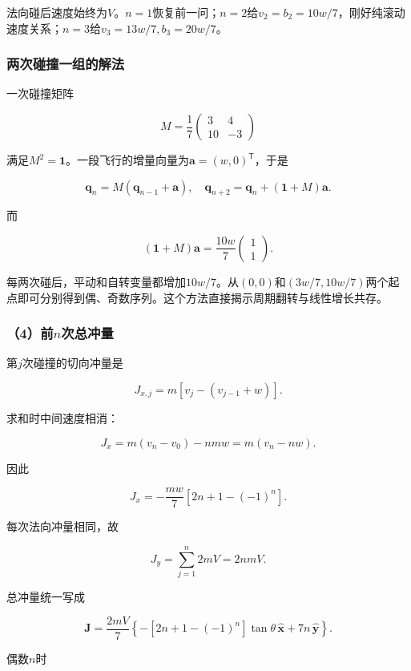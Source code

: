 \documentclass[12pt,a4paper,fontset=fandol]{ctexart}
\begin{document}
法向碰后速度始终为\(V\)。\(n=1\)恢复前一问；\(n=2\)给\(v_2=b_2=10w/7\)，刚好纯滚动速度关系；\(n=3\)给\(v_3=13w/7,b_3=20w/7\)。

\subsubsection{两次碰撞一组的解法}\label{ux4e24ux6b21ux78b0ux649eux4e00ux7ec4ux7684ux89e3ux6cd5}

一次碰撞矩阵

\[
M=\frac17
\begin{pmatrix}3&4\\10&-3\end{pmatrix}
\]

满足\(M^2=\mathbf1\)。一段飞行的增量向量为\(\boldsymbol a=(w,0)^{\mathsf T}\)，于是

\[
\boldsymbol q_n=M(\boldsymbol q_{n-1}+\boldsymbol a),
\quad
\boldsymbol q_{n+2}=\boldsymbol q_n+(\mathbf1+M)\boldsymbol a.
\]

而

\[
(\mathbf1+M)\boldsymbol a
=\frac{10w}{7}\begin{pmatrix}1\\1\end{pmatrix}.
\]

每两次碰后，平动和自转变量都增加\(10w/7\)。从\((0,0)\)和\((3w/7,10w/7)\)两个起点即可分别得到偶、奇数序列。这个方法直接揭示周期翻转与线性增长共存。

\subsubsection{\texorpdfstring{（4）前\(n\)次总冲量}{（4）前n次总冲量}}\label{ux524dnux6b21ux603bux51b2ux91cf}

第\(j\)次碰撞的切向冲量是

\[
J_{x,j}=m[v_j-(v_{j-1}+w)].
\]

求和时中间速度相消：

\[
J_x=m(v_n-v_0)-nmw=m(v_n-nw).
\]

因此

\[
J_x=-\frac{mw}{7}[2n+1-(-1)^n].
\]

每次法向冲量相同，故

\[
J_y=\sum_{j=1}^n2mV=2nmV.
\]

总冲量统一写成

\[
\boxed{
\boldsymbol J=\frac{2mV}{7}
\left\{-[2n+1-(-1)^n]\tan\theta\,
\hat{\boldsymbol x}+7n\,\hat{\boldsymbol y}\right\}}.
\]

偶数\(n\)时
\end{document}
